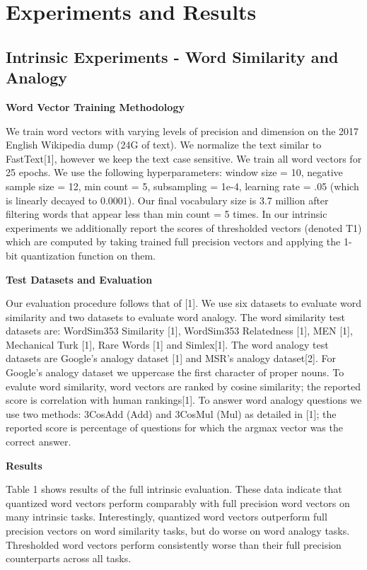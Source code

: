 \documentclass{article} %
\begin{document}
\section{Experiments and Results}
\subsection{Intrinsic Experiments - Word Similarity and Analogy}
\textbf{Word Vector Training Methodology}

We train word vectors with varying levels of precision and dimension
on the 2017 English Wikipedia dump (24G of text). We normalize the
text similar to FastText[1], however we keep the text case
sensitive. We train all word vectors for 25 epochs. We use the
following hyperparameters: window size = 10, negative sample size =
12, min count = 5, subsampling = 1e-4, learning rate = .05 (which is
linearly decayed to 0.0001). Our final vocabulary size is 3.7 million
after filtering words that appear less than min count = 5 times. In
our intrinsic experiments we additionally report the scores of
thresholded vectors (denoted T1) which are computed by taking
trained full precision vectors and applying the 1-bit quantization function
on them.

\textbf{Test Datasets and Evaluation}

Our evaluation procedure follows that of [1]. We use six datasets to
evaluate word similarity and two datasets to evaluate word
analogy. The word similarity test datasets are: WordSim353 Similarity
[1], WordSim353 Relatedness [1], MEN [1], Mechanical Turk [1], Rare
Words [1] and Simlex[1]. The word analogy test datasets are Google's
analogy dataset [1] and MSR's analogy dataset[2]. For Google's analogy
dataset we uppercase the first character of proper nouns. To evalute
word similarity, word vectors are ranked by cosine similarity; the
reported score is correlation with human rankings[1]. To answer word
analogy questions we use two methods: 3CosAdd (Add) and 3CosMul (Mul)
as detailed in [1]; the reported score is percentage of questions for
which the argmax vector was the correct answer.

\textbf{Results}

Table 1 shows results of the full intrinsic evaluation. These data
indicate that quantized word vectors perform comparably with full
precision word vectors on many intrinsic tasks. Interestingly,
quantized word vectors outperform full precision vectors on word
similarity tasks, but do worse on word analogy tasks. Thresholded word
vectors perform consistently worse than their full precision
counterparts across all tasks.
\end{document}
